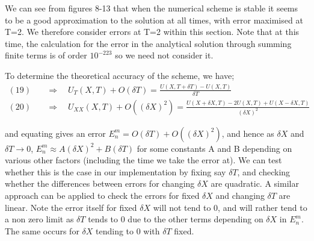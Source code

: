 \documentclass[10pt,a4paper]{report}
\begin{document}
We can see from figures 8-13 that when the numerical scheme is stable it seems to be a good approximation to the solution at all times, with error maximised at T=2. We therefore consider errors at T=2 within this section. Note that at this time, the calculation for the error in the analytical solution through summing finite terms is of order $10^{-223}$ so we need not consider it.\par
\vspace{0.5cm}
To determine the theoretical accuracy of the scheme, we have;
\begin{align*}
(19) \quad &\Rightarrow \quad U_T(X,T)+O(\delta T)=\frac{U(X,T+\delta T)-U(X,T)}{\delta T}\\
(20) \quad &\Rightarrow \quad U_{XX}(X,T)+O((\delta X)^2)=\frac{U(X+\delta X,T)-2U(X,T)+U(X-\delta X,T)}{(\delta X)^2}
\end{align*}

and equating gives an error $E_n^m=O(\delta T)+O((\delta X)^2)$, and hence as $\delta X$ and $\delta T \rightarrow 0$, $E_n^m \approx A(\delta X)^2 + B(\delta T)$ for some constants A and B depending on various other factors (including the time we take the error at). We can test whether this is the case in our implementation by fixing say $\delta T$, and checking whether the differences between errors for changing $\delta X$ are quadratic. A similar approach can be applied to check the errors for fixed $\delta X$ and changing $\delta T$ are linear. Note the error itself for fixed $\delta X$ will not tend to 0, and will rather tend to a non zero limit as $\delta T$ tends to 0 due to the other terms depending on $\delta X$ in $E_n^m$. The same occurs for $\delta X$ tending to 0 with $\delta T$ fixed. 
\end{document}
